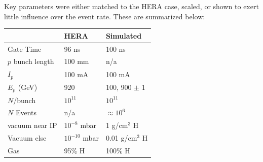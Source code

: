 Key parameters were either matched to the HERA case, scaled, or shown to exert little influence over the event rate.  These are summarized below:
\begin{center}
	\begin{tabular}{ l l l } 
		   & HERA & Simulated \\ 
		\hline \hline
		Gate Time & 96 ns & 100 ns \\ 
		$p$ bunch length & 100 mm & n/a \\ 
		$I_p$ & 100 mA & 100 mA\\
		$E_p$ (GeV)& 920 & 100, 900 $\pm$ 1 \\
		$N$/bunch & $10^{11}$ & $10^{11}$\\
		$N$ Events & n/a & $\approx 10^6$\\
		vacuum near IP& $10^{-8}$ mbar  & 1 g/cm$^3$ H \\
		Vacuum else& $10^{-10}$ mbar & 0.01 g/cm$^3$ H\\
		Gas & 95\% H & 100\% H\\
		\hline
	\end{tabular}
\end{center}


